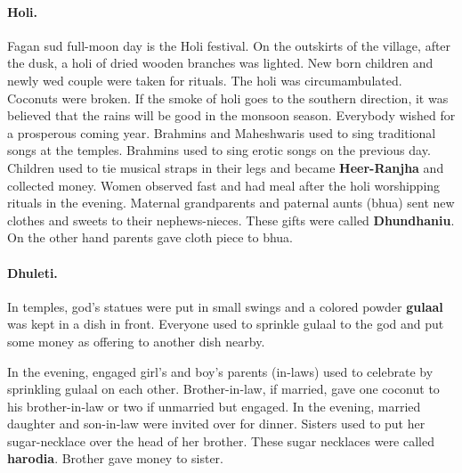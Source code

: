 \paragraph{Holi.} Fagan sud full-moon day is the Holi festival. On the
outskirts of the village, after the dusk, a holi of dried wooden branches was
lighted. New born children and newly wed couple were taken for rituals. The
holi was circumambulated. Coconuts were broken. If the smoke of holi goes to
the southern direction, it was believed that the rains will be good in the
monsoon season.  Everybody wished for a prosperous coming year. Brahmins and
Maheshwaris used to sing traditional songs at the temples. Brahmins used to
sing erotic songs on the previous day. Children used to tie musical straps in
their legs and became \textbf{Heer-Ranjha} and collected money. Women observed
fast and had meal after the holi worshipping rituals in the evening. Maternal
grandparents and paternal aunts (bhua) sent new clothes and sweets to their
nephews-nieces. These gifts were called \textbf{Dhundhaniu}. On the other hand
parents gave cloth piece to bhua.  \paragraph{Dhuleti.} In temples, god's
statues were put in small swings and a colored powder \textbf{gulaal} was kept
in a dish in front. Everyone used to sprinkle gulaal to the god and put some
money as offering to another dish nearby.

In the evening, engaged girl's and boy's parents (in-laws) used to celebrate by
sprinkling gulaal on each other. Brother-in-law, if married, gave one coconut to
his brother-in-law or two if unmarried but engaged. In the evening, married
daughter and son-in-law were invited over for dinner. Sisters used to put her
sugar-necklace over the head of her brother. These sugar necklaces were called
\textbf{harodia}. Brother gave money to sister.


